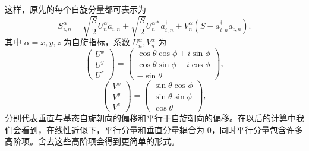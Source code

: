\documentclass[UTF8]{ctexart}
\begin{document}
这样，原先的每个自旋分量都可表示为
\begin{equation}
S_{i,n}^{\alpha}=\sqrt{\frac{S}{2}}U_{n}^{\alpha}a_{i,n}+\sqrt{\frac{S}{2}}U_{n}^{\alpha*}a_{i,n}^{\dagger}+V_{n}^{\alpha}\left(S-a_{i,n}^{\dagger}a_{i,n}\right).
\end{equation}
其中 $\alpha=x,y,z$ 为自旋指标，系数 $U_{n}^{\alpha},V_{n}^{\alpha}$ 为
\begin{equation}
\left(\begin{array}{c}
U^{x}\\
U^{y}\\
U^{z}
\end{array}\right)=\left(\begin{array}{c}
\cos\theta\cos\phi+i\sin\phi\\
\cos\theta\sin\phi-i\cos\phi\\
-\sin\theta
\end{array}\right),
\end{equation}
\begin{equation}
\left(\begin{array}{c}
V^{x}\\
V^{y}\\
V^{z}
\end{array}\right)=\left(\begin{array}{c}
\sin\theta\cos\phi\\
\sin\theta\sin\phi\\
\cos\theta
\end{array}\right),
\end{equation}
分别代表垂直与基态自旋朝向的偏移和平行于自旋朝向的偏移。在以后的计算中我们会看到，在线性近似下，平行分量和垂直分量耦合为 0，同时平行分量包含许多高阶项。舍去这些高阶项会得到更简单的形式。
\end{document}
